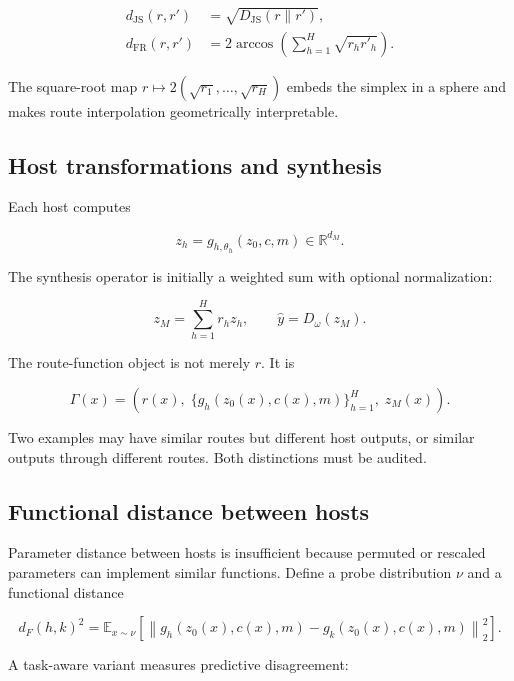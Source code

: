 \documentclass[11pt,a4paper]{article}
\newcommand{\E}{\mathbb{E}}
\newcommand{\R}{\mathbb{R}}
\newcommand{\JS}{D_{\mathrm{JS}}}
\newcommand{\norm}[1]{\left\lVert #1 \right\rVert}
\begin{document}
\begin{align}
 d_{\mathrm{JS}}(r,r') &= \sqrt{\JS(r\|r')},\\
 d_{\mathrm{FR}}(r,r') &= 2\arccos\left(\sum_{h=1}^H\sqrt{r_hr'_h}\right).
\end{align}

The square-root map \(r\mapsto 2(\sqrt{r_1},\ldots,\sqrt{r_H})\) embeds the simplex in a sphere and makes route interpolation geometrically interpretable.

\subsection{Host transformations and synthesis}

Each host computes

\begin{equation}
 z_h=g_{h,\theta_h}(z_0,c,m)\in\R^{d_M}.
\end{equation}

The synthesis operator is initially a weighted sum with optional normalization:

\begin{equation}
 z_M=\sum_{h=1}^H r_h z_h,
 \qquad \hat y=D_\omega(z_M).
\end{equation}

The route-function object is not merely \(r\). It is

\begin{equation}
 \Gamma(x)=\left(r(x),\;\{g_h(z_0(x),c(x),m)\}_{h=1}^H,\;z_M(x)\right).
\end{equation}

Two examples may have similar routes but different host outputs, or similar outputs through different routes. Both distinctions must be audited.

\subsection{Functional distance between hosts}

Parameter distance between hosts is insufficient because permuted or rescaled parameters can implement similar functions. Define a probe distribution \(\nu\) and a functional distance

\begin{equation}
 d_F(h,k)^2=\E_{x\sim\nu}\left[\norm{g_h(z_0(x),c(x),m)-g_k(z_0(x),c(x),m)}_2^2\right].
\end{equation}

A task-aware variant measures predictive disagreement:
\end{document}

